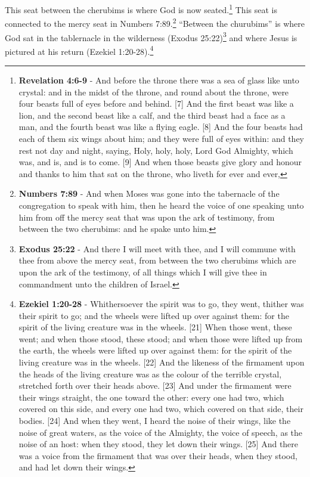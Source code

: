 This seat between the cherubims is where God is now seated.\footnote{\textbf{Revelation 4:6-9} - And before the throne there was a sea of glass like unto crystal: and in the midst of the throne, and round about the throne, were four beasts full of eyes before and behind. [7] And the first beast was like a lion, and the second beast like a calf, and the third beast had a face as a man, and the fourth beast was like a flying eagle. [8] And the four beasts had each of them six wings about him; and they were full of eyes within: and they rest not day and night, saying, Holy, holy, holy, Lord God Almighty, which was, and is, and is to come. [9] And when those beasts give glory and honour and thanks to him that sat on the throne, who liveth for ever and ever,} This seat is connected to the mercy seat in Numbers 7:89.\footnote{\textbf{Numbers 7:89} - And when Moses was gone into the tabernacle of the congregation to speak with him, then he heard the voice of one speaking unto him from off the mercy seat that was upon the ark of testimony, from between the two cherubims: and he spake unto him.} ``Between the churubims'' is where God sat in the tablernacle in the wilderness (Exodus 25:22)\footnote{\textbf{Exodus 25:22} - And there I will meet with thee, and I will commune with thee from above the mercy seat, from between the two cherubims which are upon the ark of the testimony, of all things which I will give thee in commandment unto the children of Israel.} and where Jesus is pictured at his return (Ezekiel 1:20-28).\footnote{\textbf{Ezekiel 1:20-28} - Whithersoever the spirit was to go, they went, thither was their spirit to go; and the wheels were lifted up over against them: for the spirit of the living creature was in the wheels. [21] When those went, these went; and when those stood, these stood; and when those were lifted up from the earth, the wheels were lifted up over against them: for the spirit of the living creature was in the wheels. [22] And the likeness of the firmament upon the heads of the living creature was as the colour of the terrible crystal, stretched forth over their heads above. [23] And under the firmament were their wings straight, the one toward the other: every one had two, which covered on this side, and every one had two, which covered on that side, their bodies. [24] And when they went, I heard the noise of their wings, like the noise of great waters, as the voice of the Almighty, the voice of speech, as the noise of an host: when they stood, they let down their wings. [25] And there was a voice from the firmament that was over their heads, when they stood, and had let down their wings.
}
